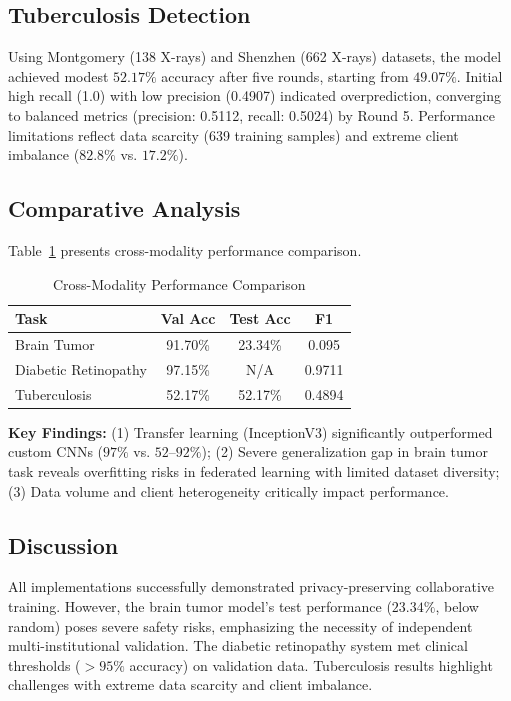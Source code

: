 \documentclass[conference]{IEEEtran}
\begin{document}
\subsection{Tuberculosis Detection}
Using Montgomery (138 X-rays) and Shenzhen (662 X-rays) datasets, the model achieved modest $52.17\%$ accuracy after five rounds, starting from $49.07\%$. Initial high recall (1.0) with low precision (0.4907) indicated overprediction, converging to balanced metrics (precision: 0.5112, recall: 0.5024) by Round 5. Performance limitations reflect data scarcity (639 training samples) and extreme client imbalance ($82.8\%$ vs. $17.2\%$).

\subsection{Comparative Analysis}
Table~\ref{tab:comparison} presents cross-modality performance comparison.

\begin{table}[!ht]
\centering
\caption{Cross-Modality Performance Comparison}
\label{tab:comparison}
\begin{tabular}{|l|c|c|c|}
\hline
\textbf{Task} & \textbf{Val Acc} & \textbf{Test Acc} & \textbf{F1} \\
\hline
Brain Tumor & 91.70\% & 23.34\% & 0.095 \\
Diabetic Retinopathy & 97.15\% & N/A & 0.9711 \\
Tuberculosis & 52.17\% & 52.17\% & 0.4894 \\
\hline
\end{tabular}
\end{table}

\textbf{Key Findings:} (1) Transfer learning (InceptionV3) significantly outperformed custom CNNs ($97\%$ vs. $52$--$92\%$); (2) Severe generalization gap in brain tumor task reveals overfitting risks in federated learning with limited dataset diversity; (3) Data volume and client heterogeneity critically impact performance.

\subsection{Discussion}
All implementations successfully demonstrated privacy-preserving collaborative training. However, the brain tumor model's test performance ($23.34\%$, below random) poses severe safety risks, emphasizing the necessity of independent multi-institutional validation. The diabetic retinopathy system met clinical thresholds ($>95\%$ accuracy) on validation data. Tuberculosis results highlight challenges with extreme data scarcity and client imbalance.
\end{document}
